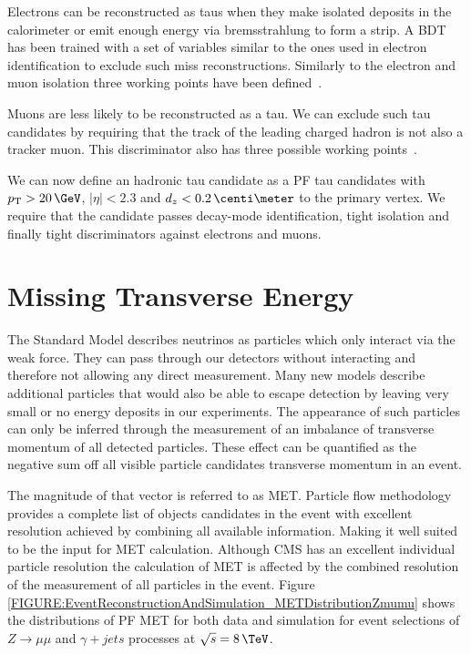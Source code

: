 Electrons can be reconstructed as taus when they make isolated deposits in the calorimeter or emit enough energy via bremsstrahlung to form a strip. A \gls{BDT} has been trained with a set of variables similar to the ones used in electron identification to exclude such miss reconstructions. Similarly to the electron and muon isolation three working points have been defined~\cite{ARTICLE:CMSPerformaceOfTauLeptonReconstruction,ARTICLE:CMSReconstructionIndentificationTau}. 

Muons are less likely to be reconstructed as a tau. We can exclude such tau candidates by requiring that the track of the leading charged hadron is not also a tracker muon. This discriminator also has three possible working points~\cite{ARTICLE:CMSPerformaceOfTauLeptonReconstruction,ARTICLE:CMSReconstructionIndentificationTau}.

We can now define an hadronic tau candidate as a \gls{PF} tau candidates with $\pt > 20 \,\GeV$, $|\eta|<2.3$ and $d_z<0.2 \,\centi\meter$ to the primary vertex. We require that the candidate passes decay-mode identification, tight isolation and finally tight discriminators against electrons and muons.

\section{Missing Transverse Energy}
\label{SECTION:EventReconstructionAndSimulation_MET}


The Standard Model describes neutrinos as particles which only interact via the weak force. They can pass through our detectors without interacting and therefore not allowing any direct measurement. Many new models describe additional particles that would also be able to escape detection by leaving very small or no energy deposits in our experiments. The appearance of such particles can only be inferred through the measurement of an imbalance of transverse momentum of all detected particles. These effect can be quantified as the negative sum off all visible particle candidates transverse momentum in an event. 

The magnitude of that vector is referred to as \acrfull{MET}. Particle flow methodology provides a complete list of objects candidates in the event with excellent resolution achieved by combining all available information. Making it well suited to be the input for \gls{MET} calculation. Although \gls{CMS} has an excellent individual particle resolution the calculation of \gls{MET} is affected by the combined resolution of the measurement of all particles in the event. Figure \ref{FIGURE:EventReconstructionAndSimulation_METDistributionZmumu} shows the distributions of \gls{PF} \gls{MET} for both data and simulation for event selections of $Z \rightarrow \mu\mu$ and $\gamma +jets$ processes at $\sqrt{s}=8\,\TeV$. 

